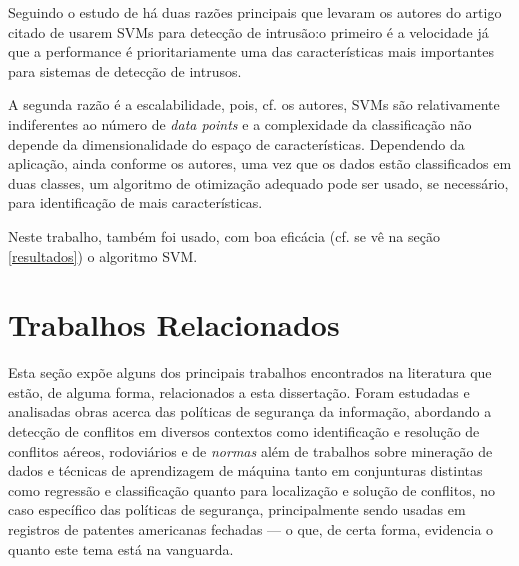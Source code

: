 Seguindo o estudo de \cite{mukkamala_intrusion_2002} há duas razões principais que levaram os autores do artigo citado de usarem SVMs para detecção de intrusão:o primeiro é a velocidade já que a performance é prioritariamente uma das características mais importantes para sistemas de detecção de intrusos. 

A segunda razão é a escalabilidade, pois, cf. os autores, SVMs são relativamente indiferentes ao número de \textit{data points} e a complexidade da classificação não depende da dimensionalidade do espaço de características. Dependendo da aplicação, ainda conforme os autores, uma vez que os dados estão classificados em duas classes, um algoritmo de otimização adequado pode ser usado, se necessário,  para identificação de mais características.

Neste trabalho, também foi usado, com boa eficácia (cf. se vê na seção \ref{resultados}) o algoritmo SVM.

\section{Trabalhos Relacionados}\label{trabalhos_relacionados}
Esta seção expõe alguns dos principais trabalhos encontrados na literatura que estão, de alguma forma, relacionados a esta dissertação. Foram estudadas e analisadas obras acerca das políticas de segurança da informação, abordando a detecção de conflitos em diversos contextos como identificação e resolução de conflitos aéreos, rodoviários e de \textit{normas} além de trabalhos sobre mineração de dados e técnicas de aprendizagem de máquina tanto em conjunturas distintas como regressão e classificação quanto para localização e solução de conflitos, no caso específico das políticas de segurança, principalmente sendo usadas em registros de patentes americanas fechadas --- o que, de certa forma, evidencia o quanto este tema está na vanguarda.

